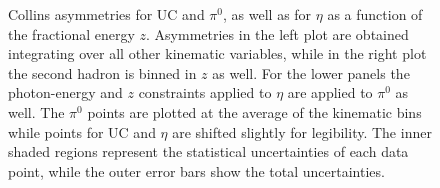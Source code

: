 \begin{figure}[H]
  \centering     
\caption[Collins asymmetries for UC and $\pi^0$, as well as for $\eta$ as a function of $z_{1}$]{Collins asymmetries for UC and $\pi^0$, as well as for $\eta$ as a function of the fractional energy $z$. 
Asymmetries in the left plot are obtained integrating over all other kinematic variables, while in the right plot the second hadron is binned in $z$ as well.
For the lower panels the photon-energy and $z$ constraints applied to $\eta$ are applied to $\pi^0$ as well. 
The $\pi^0$ points are plotted at the average of the kinematic bins while points for UC and $\eta$ are shifted slightly for legibility. 
The inner shaded regions represent the statistical uncertainties of each data point, while the outer error bars show the total uncertainties.}
\label{fig:finalasymmetry2}
\end{figure}

